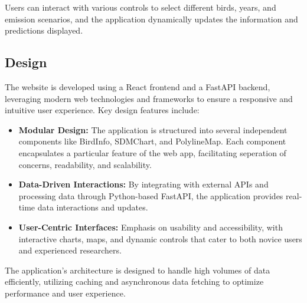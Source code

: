 \documentclass{article}
\begin{document}
Users can interact with various controls to select different birds, years, and emission scenarios, and the application dynamically updates the information and predictions displayed.

\subsection{Design}
The website is developed using a React frontend and a FastAPI backend, leveraging modern web technologies and frameworks to ensure a responsive and intuitive user experience. Key design features include:

\begin{itemize}
    \item \textbf{Modular Design:} The application is structured into several independent components like BirdInfo, SDMChart, and PolylineMap. Each component encapsulates a particular feature of the web app, facilitating seperation of concerns, readability, and scalability.
    \item \textbf{Data-Driven Interactions:} By integrating with external APIs and processing data through Python-based FastAPI, the application provides real-time data interactions and updates.
    \item \textbf{User-Centric Interfaces:} Emphasis on usability and accessibility, with interactive charts, maps, and dynamic controls that cater to both novice users and experienced researchers.
\end{itemize}

The application's architecture is designed to handle high volumes of data efficiently, utilizing caching and asynchronous data fetching to optimize performance and user experience.
\end{document}
